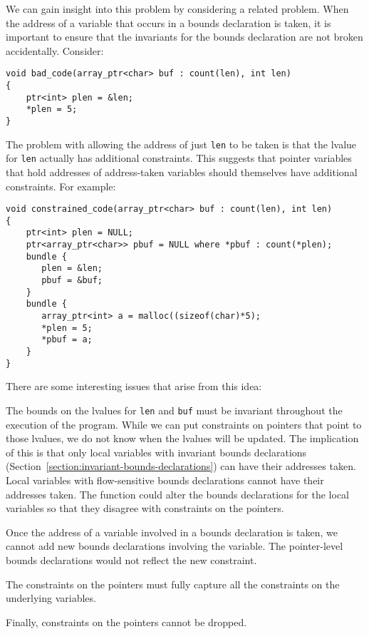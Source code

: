 We can gain insight into this problem by considering a related
problem.   When the address of a variable that occurs in a bounds declaration is 
taken, it is important to ensure that the invariants for the bounds declaration are not
broken accidentally.  Consider:
\begin{lstlisting}
void bad_code(array_ptr<char> buf : count(len), int len) 
{
    ptr<int> plen = &len;
    *plen = 5;
}
\end{lstlisting}
The problem with allowing the address of just \texttt{len} to be taken is
that the lvalue for \texttt{len} actually has additional constraints. This
suggests that pointer variables that hold addresses of address-taken variables should
themselves have additional constraints.  For example:
\begin{lstlisting}
void constrained_code(array_ptr<char> buf : count(len), int len) 
{
    ptr<int> plen = NULL;
    ptr<array_ptr<char>> pbuf = NULL where *pbuf : count(*plen);
    bundle {
       plen = &len;
       pbuf = &buf;
    }
    bundle {
       array_ptr<int> a = malloc((sizeof(char)*5);
       *plen = 5;
       *pbuf = a;
    }
}
\end{lstlisting}
There are some interesting issues that arise from this idea:
\begin{compactitem}
\item The bounds on the lvalues for \texttt{len} and
\texttt{buf} must be invariant throughout the execution of the program.
While we can put constraints on pointers that point to those lvalues,
we do not know when the lvalues will be updated.
The implication of this is that only local variables with invariant
bounds declarations (Section~\ref{section:invariant-bounds-declarations})
can have their addresses taken.   Local variables
with flow-sensitive bounds declarations cannot have their addresses taken.
The function could alter the bounds declarations for the local variables
so that they disagree with constraints on the pointers.
\item Once the address of a variable involved in a bounds declaration 
is taken, we cannot add new bounds declarations involving the variable.
The pointer-level bounds declarations would not reflect the new constraint.
\item The constraints on the pointers must fully capture 
all the constraints on the underlying variables.
\item Finally, constraints on the pointers cannot be dropped.
\end{compactitem}

